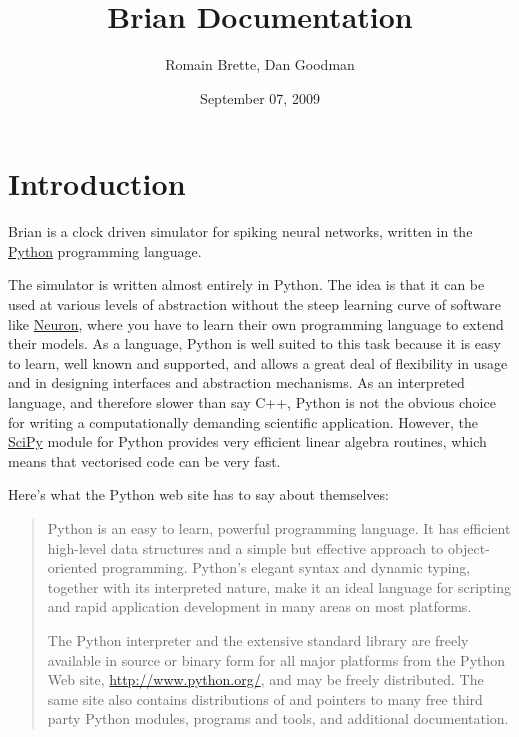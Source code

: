 \documentclass[letterpaper,10pt,english]{manual}
\title{Brian Documentation}
\date{September 07, 2009}
\author{Romain Brette, Dan Goodman}
\begin{document}
\maketitle
\tableofcontents


\hypertarget{module-brian}{}
\resetcurrentobjects
\hypertarget{--doc-introduction}{}

\chapter{Introduction}

Brian is a clock driven simulator for spiking neural networks, written in the \href{http://www.python.org}{Python} programming language.

The simulator is written almost entirely in Python. The idea is that
it can be used at various levels
of abstraction without the steep learning curve of software like \href{http://www.neuron.yale.edu/neuron/}{Neuron}, where you have to learn their
own programming language to extend their models. As a language, Python is well suited to this task
because it is easy to learn, well known and supported, and allows a great deal of flexibility in usage
and in designing interfaces and abstraction mechanisms. As an interpreted language, and therefore slower
than say C++, Python is not the obvious choice for writing a computationally demanding scientific
application. However, the \href{http://www.scipy.org/}{SciPy} module for Python provides very efficient linear algebra routines, which
means that vectorised code can be very fast.

Here's what the Python web site has to say about themselves:
\begin{quote}

Python is an easy to learn, powerful programming language. It has efficient
high-level data structures and a simple but effective approach to
object-oriented programming. Python's elegant syntax and dynamic typing,
together with its interpreted nature, make it an ideal language for
scripting and rapid application development in many areas on most platforms.

The Python interpreter and the extensive standard library are freely
available in source or binary form for all major platforms from the
Python Web site, \href{http://www.python.org/}{http://www.python.org/}, and may be freely distributed.
The same site also contains distributions of and pointers to many free
third party Python modules, programs and tools, and additional documentation.
\end{quote}
\end{document}
